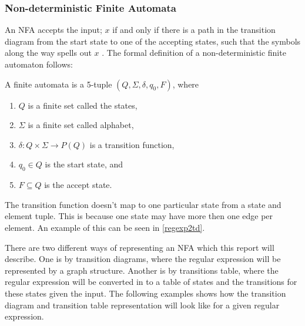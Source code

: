 \subsubsection{Non-deterministic Finite Automata}
An NFA accepts the input; $x$ if and only if there is a path in the transition 
diagram from the start state to one of the accepting states, such that the 
symbols along the way spells out $x$ \cite{Aho2006}.
The formal definition of a non-deterministic finite automaton follows:
\begin{definition} \label{finiteAutomataDef}
A finite automata is a 5-tuple $(Q, \Sigma, \delta, q_0, F)$, where
\begin{enumerate}
  \item $Q$ is a finite set called the states,
  \item $\Sigma$ is a finite set called alphabet,
  \item $\delta: Q \times \Sigma \to P(Q)$ is a transition function,
  \item $q_0 \in Q$ is the start state, and
  \item $F \subseteq Q$ is the accept state.
\end{enumerate} 
\end{definition}
The transition function doesn't map to one particular state from a
state and element tuple. This is because one state may have more then one edge
per element. An example of this can be seen in \cref{regexp2td}.

There are two different ways of representing an NFA which this report will
describe. One is by transition diagrams, where the regular expression will be
represented by a graph structure. Another is by transitions table, where the 
regular expression will be converted in to a table of states and the 
transitions for these states given the input. The following examples shows how 
the transition diagram and transition table representation will look like for a 
given regular expression.

